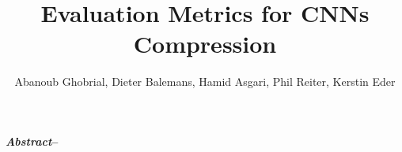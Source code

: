 \documentclass[runningheads,twocolumn,a4paper,10pt]{llncs}
\begin{document}
 

\title{Evaluation Metrics for CNNs Compression}%

\author{Abanoub Ghobrial, Dieter Balemans, Hamid Asgari, Phil Reiter, Kerstin Eder}


\maketitle

%
\makeatletter
\renewcommand\subsubsection{\@startsection{subsubsection}{3}{\z@}%
                       {-18\p@ \@plus -4\p@ \@minus -4\p@}%
                       {4\p@ \@plus 2\p@ \@minus 2\p@}%
                       {\normalfont\normalsize\bfseries\boldmath
                        \rightskip=\z@ \@plus 8em\pretolerance=10000 }}
\makeatother

\textbf{\textit{Abstract}--}



\printbibliography

\end{document}
